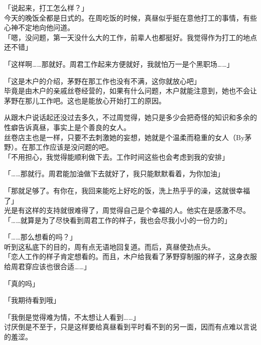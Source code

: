 \vspace{2\baselineskip}

「说起来，打工怎么样？」\\

今天的晚饭全都是日式的。在周吃饭的时候，真昼似乎挺在意他打工的事情，有些心神不定地向他问道。\\

「嗯，没问题，第一天没什么大的工作，前辈人也都挺好。我觉得作为打工的地点还不错」

「这样啊……那就好。周君工作起来方便就好，我就怕万一是个黑职场……」

「这是木户的介绍，茅野在那工作也没有不满，这你就放心吧」\\

毕竟是由木户的亲戚丝卷经营的，如果有什么问题，木户就能注意到，她也不会让茅野在那儿工作吧。这也是能放心开始打工的原因。

从跟木户说话起还没过去多久，不过周觉得，她只是多少会把奇怪的知识和多余的性癖告诉真昼，事实上是个善良的女人。\\

丝卷店主也是一样，只要不去刺激她的妄想，她就是个温柔而稳重的女人（By茅野）。在那工作应该是没问题的吧。\\

「不用担心，我觉得能顺利做下去。工作时间这些也会考虑到我的安排」

「……那就行。周君能加油做下去就好了，我只能默默看着，为你加油」

「那就足够了。有你在，我回来能吃上好吃的饭，洗上热乎乎的澡，这就很幸福了」\\

光是有这样的支持就很难得了，周觉得自己是个幸福的人。他实在是感激不尽。\\

「……就算是为了尽快看到周君工作的样子，我也会尽我小小的一份力的」

「……那么想看的吗？」\\

听到这私底下的目的，周有点无语地回复道。而后，真昼使劲点头。\\

「恋人工作的样子肯定想看的。而且，木户给我看了茅野穿制服的样子，这身衣服给周君穿应该也很合适……」

「真的吗」

「我期待看到哦」

「我倒是觉得难为情，不太想让人看到……」\\

讨厌倒是不至于，只是这样要给真昼看到平时看不到的另一面，因而有点难以言说的羞涩。

